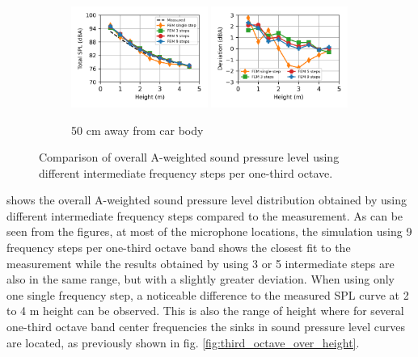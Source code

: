 \begin{figure}
	\begin{subfigure}[b]{\textwidth}
		\centering
		\includegraphics[width=0.49\textwidth]{fig/chap5/freq_steps/overall_SPL/pos_f.png}
		\includegraphics[width=0.49\textwidth]{fig/chap5/freq_steps/overall_SPL/pos_f_deviation.png}
		\caption{50 cm away from car body}
	\end{subfigure}
	\caption{Comparison of overall A-weighted sound pressure level using different intermediate frequency steps per one-third octave.}
	\label{fig:overall_SPL_freq_steps}
\end{figure}

 shows the overall A-weighted sound pressure level distribution obtained by using different intermediate frequency steps compared to the measurement. %
As can be seen from the figures, at most of the microphone locations, the simulation using 9 frequency steps per one-third octave band shows the closest fit to the measurement while the results obtained by using 3 or 5 intermediate steps are also in the same range, but with a slightly greater deviation. When using only one single frequency step, a noticeable difference to the measured SPL curve at 2 to 4 m height can be observed. This is also the range of height where for several one-third octave band center frequencies the sinks in sound pressure level curves are located, as previously shown in fig. \ref{fig:third_octave_over_height}.


